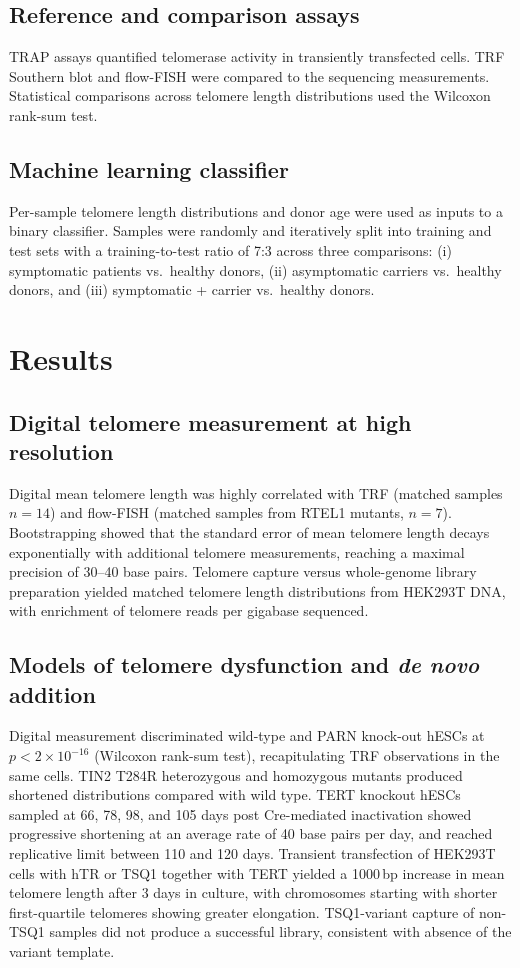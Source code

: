 \documentclass[11pt]{article}
\begin{document}
\subsection{Reference and comparison assays}
TRAP assays quantified telomerase activity in transiently transfected cells. TRF Southern blot and flow-FISH were compared to the sequencing measurements. Statistical comparisons across telomere length distributions used the Wilcoxon rank-sum test.

\subsection{Machine learning classifier}
Per-sample telomere length distributions and donor age were used as inputs to a binary classifier. Samples were randomly and iteratively split into training and test sets with a training-to-test ratio of 7:3 across three comparisons: (i) symptomatic patients vs.\ healthy donors, (ii) asymptomatic carriers vs.\ healthy donors, and (iii) symptomatic + carrier vs.\ healthy donors.

\section{Results}
\subsection{Digital telomere measurement at high resolution}
Digital mean telomere length was highly correlated with TRF (matched samples $n=14$) and flow-FISH (matched samples from RTEL1 mutants, $n=7$). Bootstrapping showed that the standard error of mean telomere length decays exponentially with additional telomere measurements, reaching a maximal precision of 30--40 base pairs. Telomere capture versus whole-genome library preparation yielded matched telomere length distributions from HEK293T DNA, with enrichment of telomere reads per gigabase sequenced.

\subsection{Models of telomere dysfunction and \textit{de novo} addition}
Digital measurement discriminated wild-type and PARN knock-out hESCs at $p < 2 \times 10^{-16}$ (Wilcoxon rank-sum test), recapitulating TRF observations in the same cells. TIN2 T284R heterozygous and homozygous mutants produced shortened distributions compared with wild type. TERT knockout hESCs sampled at 66, 78, 98, and 105 days post Cre-mediated inactivation showed progressive shortening at an average rate of 40 base pairs per day, and reached replicative limit between 110 and 120 days. Transient transfection of HEK293T cells with hTR or TSQ1 together with TERT yielded a 1000\,bp increase in mean telomere length after 3 days in culture, with chromosomes starting with shorter first-quartile telomeres showing greater elongation. TSQ1-variant capture of non-TSQ1 samples did not produce a successful library, consistent with absence of the variant template.
\end{document}
